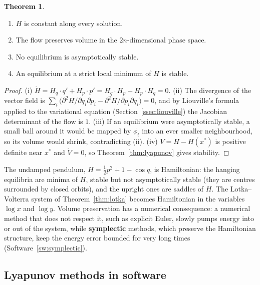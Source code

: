 \documentclass[11pt,a4paper]{article}
\numberwithin{equation}{section}
\theoremstyle{definition}
\newtheorem{thm}{Theorem}[subsection]
\begin{document}
\begin{thm}
\label{thm:hamilton}
\begin{enumerate}[label=(\roman*)]
\item $H$ is constant along every solution.
\item The flow preserves volume in the $2n$-dimensional phase space.
\item No equilibrium is asymptotically stable.
\item An equilibrium at a strict local minimum of $H$ is stable.
\end{enumerate}
\end{thm}

\begin{proof}
(i) $\dot H = H_q\cdot q' + H_p\cdot p' = H_q\cdot H_p - H_p\cdot H_q = 0$. (ii) The divergence of the vector field is $\sum_i\bigl(\partial^2H/\partial q_i\partial p_i - \partial^2H/\partial p_i\partial q_i\bigr) = 0$, and by Liouville's formula applied to the
variational equation (Section~\ref{ssec:liouville}) the Jacobian determinant of the flow is $1$. (iii) If an equilibrium were asymptotically stable, a small ball around it would be mapped by $\phi_t$ into an ever
smaller neighbourhood, so its volume would shrink, contradicting (ii). (iv) $V = H - H(x^*)$ is positive definite near $x^*$ and $\dot V = 0$, so Theorem~\ref{thm:lyapunov} gives stability.
\end{proof}

The undamped pendulum, $H = \frac12p^2 + 1 - \cos q$, is Hamiltonian: the hanging equilibria are minima of $H$, stable but not asymptotically stable (they are centres surrounded by closed orbits), and the
upright ones are saddles of $H$. The Lotka--Volterra system of Theorem~\ref{thm:lotka} becomes Hamiltonian in the variables $\log x$ and $\log y$. Volume preservation has a numerical consequence: a
numerical method that does not respect it, such as explicit Euler, slowly pumps energy into or out of the system, while \textbf{symplectic} methods, which preserve the Hamiltonian structure,
keep the energy error bounded for very long times (Software~\ref{sw:symplectic}).

\subsection{Lyapunov methods in software}
\label{ssec:software11}
\end{document}
